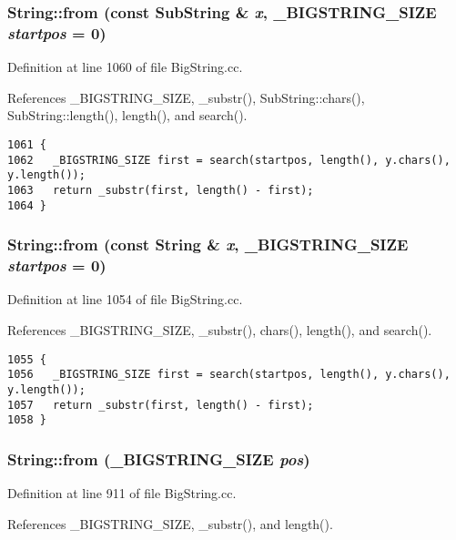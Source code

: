 \subsubsection{ String::from (const {\bf Sub\-String} \& {\em x}, {\bf \_\-BIGSTRING\_\-SIZE} {\em startpos} = 0)}\label{classString_a72}




Definition at line 1060 of file Big\-String.cc.

References \_\-BIGSTRING\_\-SIZE, \_\-substr(), Sub\-String::chars(), Sub\-String::length(), length(), and search().



\footnotesize\begin{verbatim}1061 {
1062   _BIGSTRING_SIZE first = search(startpos, length(), y.chars(), y.length());
1063   return _substr(first, length() - first);
1064 }
\end{verbatim}\normalsize 
{}
\subsubsection{ String::from (const String \& {\em x}, {\bf \_\-BIGSTRING\_\-SIZE} {\em startpos} = 0)}\label{classString_a71}




Definition at line 1054 of file Big\-String.cc.

References \_\-BIGSTRING\_\-SIZE, \_\-substr(), chars(), length(), and search().



\footnotesize\begin{verbatim}1055 {
1056   _BIGSTRING_SIZE first = search(startpos, length(), y.chars(), y.length());
1057   return _substr(first, length() - first);
1058 }
\end{verbatim}\normalsize 
{}
\subsubsection{ String::from ({\bf \_\-BIGSTRING\_\-SIZE} {\em pos})}\label{classString_a70}




Definition at line 911 of file Big\-String.cc.

References \_\-BIGSTRING\_\-SIZE, \_\-substr(), and length().

